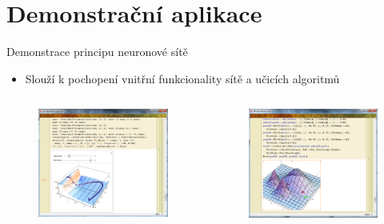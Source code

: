 \documentclass{beamer}
\begin{document}
\section{Demonstrační aplikace}
\begin{frame}{Demonstrace principu neuronové sítě}
\begin{itemize}
\item Slouží k pochopení vnitřní funkcionality sítě a učicích algoritmů
\end{itemize} 
  \begin{columns}[T]
    \column{5cm}
      \begin{figure}
   \includegraphics[width=5.5cm]{uk1.png}
\end{figure}
    \column{5cm}
      \begin{figure}
   \includegraphics[width=5.5cm]{uk2.png}
\end{figure}
  \end{columns}
\end{frame}
\end{document}
